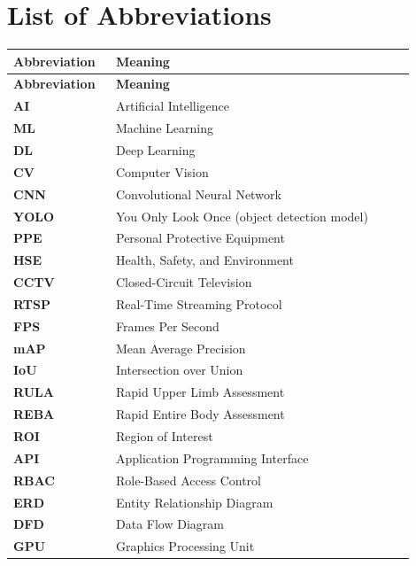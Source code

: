 \chapter*{List of Abbreviations}

\begin{longtable}{|>{\bfseries}p{0.22\linewidth}|p{0.68\linewidth}|}
\hline
\textbf{Abbreviation} & \textbf{Meaning} \\
\hline
\endfirsthead
\hline
\textbf{Abbreviation} & \textbf{Meaning} \\
\hline
\endhead
AI & Artificial Intelligence \\
\hline
ML & Machine Learning \\
\hline
DL & Deep Learning \\
\hline
CV & Computer Vision \\
\hline
CNN & Convolutional Neural Network \\
\hline
YOLO & You Only Look Once (object detection model) \\
\hline
PPE & Personal Protective Equipment \\
\hline
HSE & Health, Safety, and Environment \\
\hline
CCTV & Closed-Circuit Television \\
\hline
RTSP & Real-Time Streaming Protocol \\
\hline
FPS & Frames Per Second \\
\hline
mAP & Mean Average Precision \\
\hline
IoU & Intersection over Union \\
\hline
RULA & Rapid Upper Limb Assessment \\
\hline
REBA & Rapid Entire Body Assessment \\
\hline
ROI & Region of Interest \\
\hline
API & Application Programming Interface \\
\hline
RBAC & Role-Based Access Control \\
\hline
ERD & Entity Relationship Diagram \\
\hline
DFD & Data Flow Diagram \\
\hline
GPU & Graphics Processing Unit \\
\hline
\end{longtable}

\listoffigures
{}

\listoftables
{}

\cleardoublepage
{}
